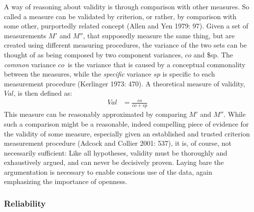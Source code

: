 \documentclass[12pt,twoside]{reedthesis}
\begin{document}
A way of reasoning about validity is through comparison with other
measures. So called a measure can be validated by criterion, or rather,
by comparison with some other, purportedly related concept (Allen and
Yen 1979: 97). Given a set of measurements \(M'\) and \(M''\), that
supposedly measure the same thing, but are created using different
measuring procedures, the variance of the two sets can be thought of as
being composed by two component variances, \(co\) and \$sp. The
\emph{common} variance \(co\)~is the variance that is caused by a
conceptual commonality between the measures, while the \emph{specific}
variance \(sp\) is specific to each measurement procedure (Kerlinger
1973: 470). A theoretical measure of validity, \(Val\), is then defined
as:
\begin{align}
Val &= \frac{co}{co + sp} \label{validityCoef}
\end{align}
This measure can be reasonably approximated by comparing \(M'\) and
\(M''\). While such a comparison might be a reasonable, indeed
compelling piece of evidence for the validity of some measure,
especially given an established and trusted criterion measurement
procedure (Adcock and Collier 2001: 537), it is, of course, not
necessarily sufficient: Like all hypotheses, validity must be thoroughly
and exhaustively argued, and can never be decisively proven. Laying bare
the argumentation is necessary to enable conscious use of the data,
again emphasizing the importance of openness.

\subsubsection{Reliability}\label{reliability}
\end{document}
